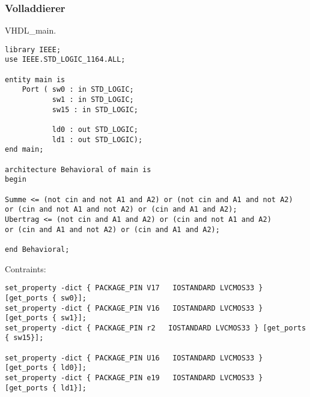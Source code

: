 \documentclass{article}
\begin{document}
\subsubsection{Volladdierer}
VHDL\_main.\newline
\begin{verbatim}
library IEEE;
use IEEE.STD_LOGIC_1164.ALL;

entity main is
    Port ( sw0 : in STD_LOGIC;
           sw1 : in STD_LOGIC;
           sw15 : in STD_LOGIC;

           ld0 : out STD_LOGIC;
           ld1 : out STD_LOGIC);
end main;

architecture Behavioral of main is
begin

Summe <= (not cin and not A1 and A2) or (not cin and A1 and not A2)
or (cin and not A1 and not A2) or (cin and A1 and A2);
Ubertrag <= (not cin and A1 and A2) or (cin and not A1 and A2)
or (cin and A1 and not A2) or (cin and A1 and A2);

end Behavioral;
\end{verbatim}
Contraints:\newline
\begin{verbatim}
set_property -dict { PACKAGE_PIN V17   IOSTANDARD LVCMOS33 } [get_ports { sw0}];
set_property -dict { PACKAGE_PIN V16   IOSTANDARD LVCMOS33 } [get_ports { sw1}];
set_property -dict { PACKAGE_PIN r2   IOSTANDARD LVCMOS33 } [get_ports { sw15}];

set_property -dict { PACKAGE_PIN U16   IOSTANDARD LVCMOS33 } [get_ports { ld0}];
set_property -dict { PACKAGE_PIN e19   IOSTANDARD LVCMOS33 } [get_ports { ld1}];
\end{verbatim}
\end{document}
